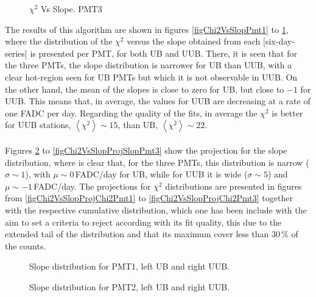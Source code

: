 \documentclass[twoside, final, 10pt]{articleMine}
\begin{document}
\begin{figure}[!t]
  \centering
  \caption{$\chi^2$ Vs Slope. PMT3}
  \label{figChi2VsSlopPmt3}
\end{figure}

The results of this algorithm are shown in figures
\ref{figChi2VsSlopPmt1} to \ref{figChi2VsSlopPmt3}, where the
distribution of the $\chi^2$ versus the slope obtained from each
[six-day-series] is presented per PMT, for both UB and UUB.
There, it is seen that for the three PMTs, the slope distribution
is narrower for UB than UUB, with a clear hot-region seen for UB
PMTs but which it is not observable in UUB. On the other hand,
the mean of the slopes is close to zero for UB, but close to $-1$
for UUB. This means that, in average, the \qpkvem values for UUB
are decreasing at a rate of one FADC per day. Regarding the
quality of the fits, in average the $\chi^2$ is better for UUB
stations, $\left<\chi^2\right>\sim 15$, than UB,
$\left<\chi^2\right>\sim 22$.\\\\Figures
\ref{figChi2VsSlopProjSlopPmt1} to
\ref{figChi2VsSlopProjSlopPmt3} show the projection for the slope
distribution, where is clear that, for the three PMTs, this
distribution is narrow ($\sigma\sim1$), with $\mu\sim0$\,FADC/day
for UB, while for UUB it is wide ($\sigma\sim5$) and
$\mu\sim-1$\,FADC/day. The projections for $\chi^2$ distributions
are presented in figures from \ref{figChi2VsSlopProjChi2Pmt1} to
\ref{figChi2VsSlopProjChi2Pmt3} together with the respective
cumulative distribution, which one has been include with the aim
to set a criteria to reject \qpkvem according with its fit
quality, this due to the extended tail of the distribution and
that its maximum cover less than $30\,\%$ of the counts.
\clearpage

\begin{figure}[!t]
  \centering
  \caption{Slope distribution for PMT1, left UB and right UUB.}
  \label{figChi2VsSlopProjSlopPmt1}
\end{figure}

\begin{figure}[!t]
  \centering
  \caption{Slope distribution for PMT2, left UB and right UUB.}
  \label{figChi2VsSlopProjSlopPmt2}
\end{figure}
\end{document}
